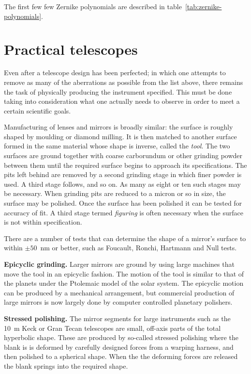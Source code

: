 The first few few Zernike polynomials are described in table~\ref{tab:zernike-polynomials}.

\section{Practical telescopes}

Even after a telescope design has been perfected; in which one attempts to 
remove as many of the aberrations as possible from the list above, there 
remains the task of physically producing the instrument specified. This must
be done taking into consideration what one actually needs to observe in 
order to meet a certain scientific goals. 

Manufacturing of lenses and mirrors is broadly similar: the surface is roughly
shaped by moulding or diamond milling. It is then matched to another surface
formed in the same material whose shape is inverse, called the {\it tool}. 
The two surfaces are ground together with coarse carborundum or other grinding
powder between them until the required surface begins to approach 
its specifications. The pits left behind are removed by a second grinding stage
in which finer powder is used. A third stage follows, and so on. As many as
eight or ten such stages may be necessary. When grinding pits are reduced to
a micron or so in size, the surface may be polished. Once the surface has been
polished it can be tested for accuracy of fit. A third stage termed {\it 
figuring} is often necessary when the surface is not within specification. 

There are a number of tests that can determine the shape of a mirror's surface
to within $\pm 50$~nm or better, such as Foucault, Ronchi, Hartmann and Null
tests. 

\noindent
{\bf Epicyclic grinding.} Larger mirrors are ground by using large machines that 
move the tool in an epicyclic fashion. The motion of the tool is similar to that of 
the planets under the Ptolemaic model of the solar system. The epicyclic motion 
can be produced by a mechanical arrangement, but commercial production of 
large mirrors is now largely done by computer controlled planetary polishers. 

\noindent
{\bf Stressed polishing.} The mirror segments for large instruments such as the 10~m
Keck or Gran Tecan telescopes are small, off-axis parts of the total hyperbolic shape. 
These are produced by so-called stressed polishing where the blank is is deformed 
by carefully designed forces from a warping harness, and then polished to a spherical
shape. When the the deforming forces are released the blank springs into the required 
shape.

